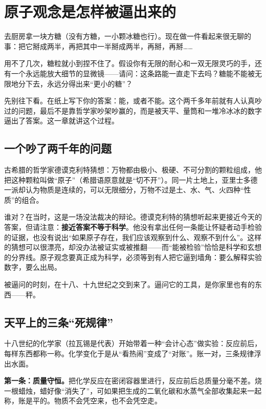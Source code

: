 \chapter{原子观念是怎样被逼出来的}

\begin{kaichang}
去厨房拿一块方糖（没有方糖，一小颗冰糖也行）。现在做一件看起来很无聊的事：把它掰成两半，再把其中一半掰成两半，再掰，再掰……

用不了几次，糖粒就小到捏不住了。假设你有无限的耐心和一双无限灵巧的手，还有一个永远能放大细节的显微镜——请问：这条路能一直走下去吗？糖能不能被无限地分下去，永远分得出来“更小的糖”？

先别往下看。在纸上写下你的答案：能，或者不能。这个两千多年前就有人认真吵过的问题，最后不是靠哲学家吵架吵赢的，而是被天平、量筒和一堆冷冰冰的数字逼出了答案。这一章就讲这个过程。
\end{kaichang}

\section{一个吵了两千年的问题}

古希腊的哲学家德谟克利特猜想：万物都由极小、极硬、不可分割的颗粒组成，他把这种颗粒叫做“原子”（希腊语原意就是“切不开”）。同一片土地上，亚里士多德一派却认为物质是连续的，可以无限细分，万物不过是土、水、气、火四种“性质”的组合。

谁对？在当时，这是一场没法裁决的辩论。德谟克利特的猜想听起来更接近今天的答案，但请注意：\textbf{接近答案不等于科学}。他没有拿出任何一条能让怀疑者动手检验的证据，也没有说出“如果原子存在，我们应该观察到什么、观察不到什么”。这样的猜想可以很漂亮，却没办法被证实或被推翻——而“能被检验”恰恰是科学和玄想的分界线。原子观念要真正成为科学，必须等到有人把它逼到墙角：要么解释实验数字，要么出局。

被逼问的时刻，在十八、十九世纪之交到来了。逼问它的工具，是你家里也有的东西——秤。

\section{天平上的三条“死规律”}

十八世纪的化学家（拉瓦锡是代表）开始带着一种“会计心态”做实验：反应前后，每样东西都称一称。化学变化于是从“看热闹”变成了“对账”。账一对，三条规律浮出水面。

\textbf{第一条：质量守恒。}把化学反应在密闭容器里进行，反应前后总质量分毫不差。烧一根蜡烛，蜡好像“消失了”，可如果把生成的二氧化碳和水蒸气全部收集起来一起称，账是平的。物质不会凭空来，也不会凭空走。

